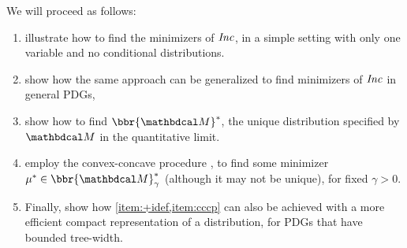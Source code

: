 \documentclass[twoside]{article}
\begin{document}
We will proceed as follows: 
\begin{enumerate}[itemsep=0pt]
    \item
    illustrate how to find the minimizers of $\mathit{Inc}$, in a simple setting with only one variable and no conditional distributions.
    \item
    show how the same approach can be generalized to find minimizers of $\mathit{Inc}$ in general PDGs,
    \item \label{item:+idef}
    show how to find $\bbr{\dg M}^*$, the unique distribution specified by $\dg M$ in the quantitative limit.
    
    \item \label{item:cccp}
    employ the convex-concave procedure 
    \parencite{yuille2003concave}, to find some minimizer $\mu^* \in \bbr{\dg M}^*_\gamma$ (although it may not be unique), for fixed $\gamma > 0$.
        
    \item 
    Finally, show how \cref{item:+idef,item:cccp} can also be achieved 
    with a more efficient compact representation of a distribution, for PDGs that have
    bounded tree-width.
\end{enumerate}

\subsection{}\label{sec:illust}
\end{document}
